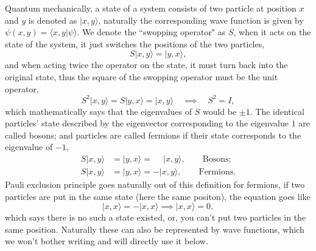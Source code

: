 \documentclass{article}
\newcommand{\be}{\begin{equation}}
\newcommand{\ee}{\end{equation}}
\renewcommand{\1}{\left}
\renewcommand{\2}{\right}
\newcommand{\la}{\langle}
\newcommand{\ra}{\rangle}
\begin{document}
Quantum mechanically, a state of a system consists of two particle at position $x$ and $y$ is denoted as $|x,y\ra$, naturally the corresponding wave function is given by $\psi(x,y)=\la x,y|\psi\ra$. We denote the ``swopping operator" as $S$, when it acts on the state of the system, it just switches the positions of the two particles,
\be S|x,y\ra=|y,x\ra, \ee
and when acting twice the operator on the state, it must turn back into the original state, thus the square of the swopping operator must be the unit operator,
\be S^2|x,y\ra=S|y,x\ra=|x,y\ra \quad\implies\quad S^2=I, \ee
which mathematically says that the eigenvalues of $S$ would be $\pm 1$.
The identical particles' state described by the eigenvector corresponding to the eigenvalue $1$ are called bosons; and particles are called fermions if their state corresponds to the eigenvalue of $-1$,
\be\begin{split}
S|x,y\ra&=|y,x\ra=\phantom{-}|x,y\ra, \quad\quad\text{Bosons};\\
S|x,y\ra&=|y,x\ra=-|x,y\ra, \quad\quad\text{Fermions}.
\end{split}\ee
Pauli exclusion principle goes naturally out of this definition for fermions, if two particles are put in the same state (here the same positon), the equation goes like \be |x,x\ra=-|x,x\ra\implies|x,x\ra=0,\ee which says there is no such a state existed, or, you can't put two particles in the same position. Naturally these can also be represented by wave functions, which we won't bother writing and will directly use it below.
\end{document}
